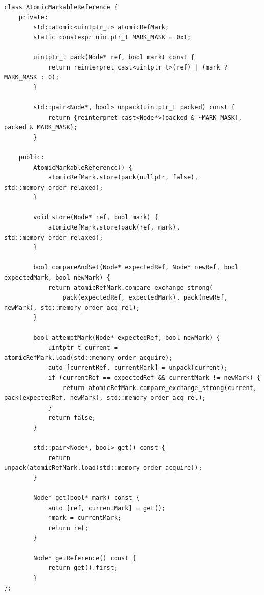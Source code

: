 \begin{lstlisting}[style=mystyle, caption=AtomicMarkableReference]
class AtomicMarkableReference {
    private:
        std::atomic<uintptr_t> atomicRefMark;
        static constexpr uintptr_t MARK_MASK = 0x1;
    
        uintptr_t pack(Node* ref, bool mark) const {
            return reinterpret_cast<uintptr_t>(ref) | (mark ? MARK_MASK : 0);
        }
    
        std::pair<Node*, bool> unpack(uintptr_t packed) const {
            return {reinterpret_cast<Node*>(packed & ~MARK_MASK), packed & MARK_MASK};
        }
    
    public:
        AtomicMarkableReference() {
            atomicRefMark.store(pack(nullptr, false), std::memory_order_relaxed);
        }
    
        void store(Node* ref, bool mark) {
            atomicRefMark.store(pack(ref, mark), std::memory_order_relaxed);
        }
    
        bool compareAndSet(Node* expectedRef, Node* newRef, bool expectedMark, bool newMark) {
            return atomicRefMark.compare_exchange_strong(
                pack(expectedRef, expectedMark), pack(newRef, newMark), std::memory_order_acq_rel);
        }
    
        bool attemptMark(Node* expectedRef, bool newMark) {
            uintptr_t current = atomicRefMark.load(std::memory_order_acquire);
            auto [currentRef, currentMark] = unpack(current);
            if (currentRef == expectedRef && currentMark != newMark) {
                return atomicRefMark.compare_exchange_strong(current, pack(expectedRef, newMark), std::memory_order_acq_rel);
            }
            return false;
        }
    
        std::pair<Node*, bool> get() const {
            return unpack(atomicRefMark.load(std::memory_order_acquire));
        }
    
        Node* get(bool* mark) const {
            auto [ref, currentMark] = get();
            *mark = currentMark;
            return ref;
        }
    
        Node* getReference() const {
            return get().first;
        }
};
\end{lstlisting}
